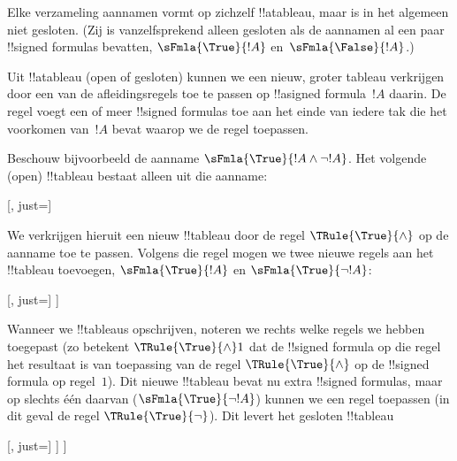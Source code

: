 \documentclass[../../../include/open-logic-section]{subfiles}
\begin{document}
\begin{ex}
  Elke verzameling aannamen vormt op zichzelf !!a{tableau}, maar is in
  het algemeen niet gesloten. (Zij is vanzelfsprekend alleen gesloten
  als de aannamen al een paar !!{signed formula}s bevatten,
  $\sFmla{\True}{!A}$ en~$\sFmla{\False}{!A}$.)

  Uit !!a{tableau} (open of gesloten) kunnen we een nieuw, groter
  tableau verkrijgen door een van de afleidingsregels toe te passen op
  !!a{signed formula}~$!A$ daarin. De regel voegt een of meer
  !!{signed formula}s toe aan het einde van iedere tak die het voorkomen
  van~$!A$ bevat waarop we de regel toepassen.

  Beschouw bijvoorbeeld de aanname $\sFmla{\True}{!A \land \lnot
    !A}$. Het volgende (open) !!{tableau} bestaat alleen uit die
  aanname:
  \begin{center}
    \begin{tableau}{}
      [, just=\TAss]
    \end{tableau}{}
  \end{center}
  We verkrijgen hieruit een nieuw !!{tableau} door de regel
  $\TRule{\True}{\land}$ op de aanname toe te passen. Volgens die regel
  mogen we twee nieuwe regels aan het !!{tableau} toevoegen,
  $\sFmla{\True}{!A}$ en $\sFmla{\True}{\lnot !A}$:
  \begin{center}
    \begin{tableau}{}
      [, just=\TAss
        [\sFmla{\True}{\formula{A}}, just={\TRule{\True}{\land}[1]},
          [\sFmla{\True}{\lnot \formula{A}}, just={\TRule{\True}{\land}[1]}
          ]
        ]
      ]
    \end{tableau}{}
  \end{center}
  Wanneer we !!{tableau}s opschrijven, noteren we rechts welke regels we
  hebben toegepast (zo betekent $\TRule{\True}{\land} 1$ dat de
  !!{signed formula} op die regel het resultaat is van toepassing van
  de regel $\TRule{\True}{\land}$ op de !!{signed formula} op
  regel~$1$). Dit nieuwe !!{tableau} bevat nu extra
  !!{signed formula}s, maar op slechts één daarvan
  ($\sFmla{\True}{\lnot !A}$) kunnen we een regel toepassen (in dit
  geval de regel $\TRule{\True}{\lnot}$). Dit levert het gesloten
  !!{tableau}
  \begin{center}
    \begin{tableau}{}
      [, just=\TAss
        [\sFmla{\True}{\formula{A}}, just={\TRule{\True}{\land}[1]}
          [\sFmla{\True}{\lnot \formula{A}}, just={\TRule{\True}{\land}[1]}
            [\sFmla{\False}{\formula{A}}, just={\TRule{\True}{\lnot}[3]}, close]
          ]
        ]
      ]
    \end{tableau}{}
  \end{center}
\end{ex}
\end{document}
